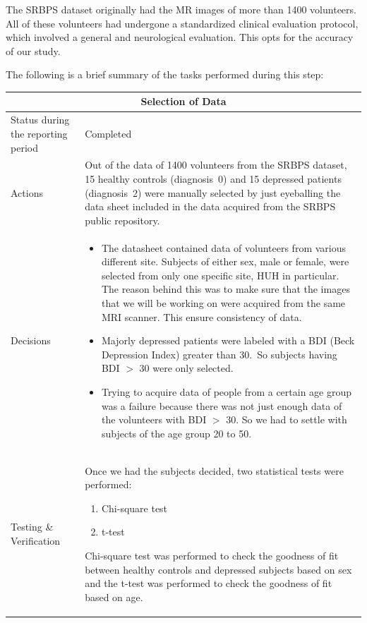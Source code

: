 \documentclass[12pt]{article}
\begin{document}
The SRBPS dataset originally had the MR images of more than 1400
volunteers. All of these volunteers had undergone a standardized
clinical evaluation protocol, which involved a general and
neurological evaluation. This opts for the accuracy of our study.

The following is a brief summary of the tasks performed during this
step:

\begin{table}[H]
  \centering
  \begin{tabular} {| m{3.3cm} | m{11.5cm} | }
    \hline
    \multicolumn{2}{|c|}{Selection of Data} \\ \hline
    Status during the reporting period   & Completed   \\ \hline
    Actions &
    Out of the data of 1400 volunteers from the SRBPS dataset, 15
    healthy controls (diagnosis~0) and 15 depressed patients
    (diagnosis~2) were manually selected by just eyeballing the data
    sheet included in the data acquired from the SRBPS public
    repository.  \\ \hline

    Decisions &
    \begin{itemize}

      \item The datasheet contained data of volunteers from various
        different site. Subjects of either sex, male or female, were
        selected from only one specific site, HUH in particular. The
        reason behind this was to make sure that the images that we
        will be working on were acquired from the same MRI scanner.
        This ensure consistency of data.

      \item Majorly depressed patients were labeled with a BDI (Beck
        Depression Index) greater than 30.~So subjects having
        BDI $>$ 30 were only selected.

      \item Trying to acquire data of people from a certain age group
        was a failure because there was not just enough data of the
        volunteers with BDI $>$ 30. So we had to settle with subjects
        of the age group 20 to 50.

    \end{itemize} \\ \hline

    Testing \& Verification &
    Once we had the subjects decided, two statistical tests were
    performed:
    \begin{enumerate}[noitemsep]
      \item Chi-square test
      \item t-test
    \end{enumerate}

    Chi-square test was performed to check the goodness of fit between
    healthy controls and depressed subjects based on sex and the
    t-test was performed to check the goodness of fit based on age. \\ \hline
  \end{tabular}
\end{table}
\end{document}

